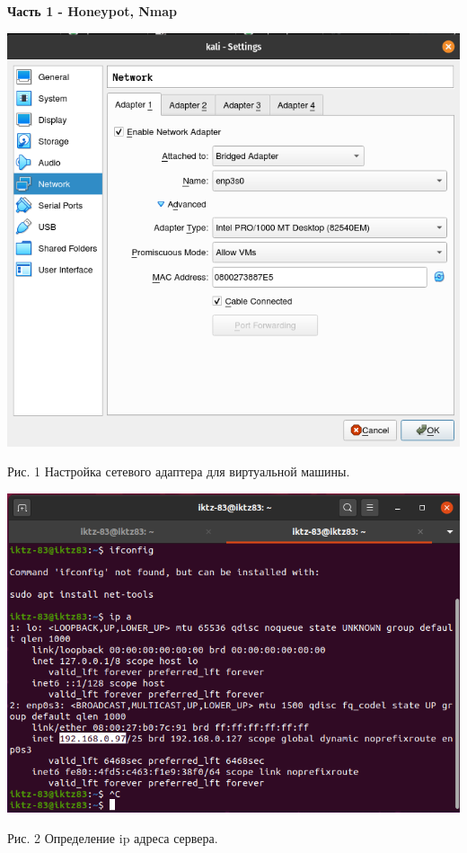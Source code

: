 \documentclass[a4paper,14pt]{extarticle}
\begin{document}
    \textbf{Часть 1 - Honeypot, Nmap}
    \begin{center}

        \singlespacing
        \includegraphics[scale=0.6]{pics/0.png}

        Рис. 1 Настройка сетевого адаптера для виртуальной машины.
        \vspace{1ex}

        \includegraphics[scale=0.55]{pics/1.png}

        Рис. 2 Определение ip адреса сервера.
        \vspace{1ex}


\end{center}
\end{document}
